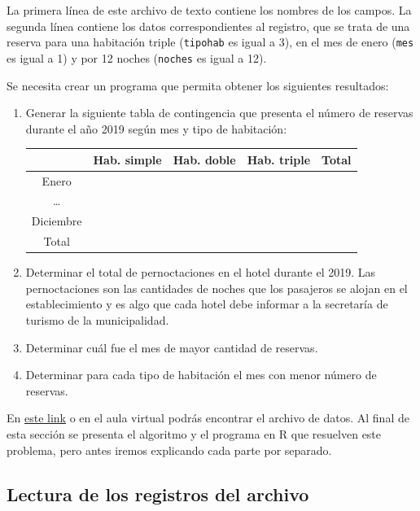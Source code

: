 \documentclass[
]{book}
\begin{document}
La primera línea de este archivo de texto contiene los nombres de los campos. La segunda línea contiene los datos correspondientes al registro, que se trata de una reserva para una habitación triple (\texttt{tipohab} es igual a 3), en el mes de enero (\texttt{mes} es igual a 1) y por 12 noches (\texttt{noches} es igual a 12).

Se necesita crear un programa que permita obtener los siguientes resultados:

\begin{enumerate}
\def\labelenumi{\alph{enumi})}
\item
  Generar la siguiente tabla de contingencia que presenta el número de reservas durante el año 2019 según mes y tipo de habitación:

  \begin{longtable}[]{@{}ccccc@{}}
  \toprule
  & Hab. simple & Hab. doble & Hab. triple & Total \\
  \midrule
  \endhead
  Enero & & & & \\
  \ldots{} & & & & \\
  Diciembre & & & & \\
  Total & & & & \\
  \bottomrule
  \end{longtable}
\item
  Determinar el total de pernoctaciones en el hotel durante el 2019. Las pernoctaciones son las cantidades de noches que los pasajeros se alojan en el establecimiento y es algo que cada hotel debe informar a la secretaría de turismo de la municipalidad.
\item
  Determinar cuál fue el mes de mayor cantidad de reservas.
\item
  Determinar para cada tipo de habitación el mes con menor número de reservas.
\end{enumerate}

En \href{https://github.com/mpru/introprog/tree/master/archivos}{este link} o en el aula virtual podrás encontrar el archivo de datos. Al final de esta sección se presenta el algoritmo y el programa en R que resuelven este problema, pero antes iremos explicando cada parte por separado.

\hypertarget{lectura-de-los-registros-del-archivo}{%
\subsection{Lectura de los registros del archivo}\label{lectura-de-los-registros-del-archivo}}
\end{document}
